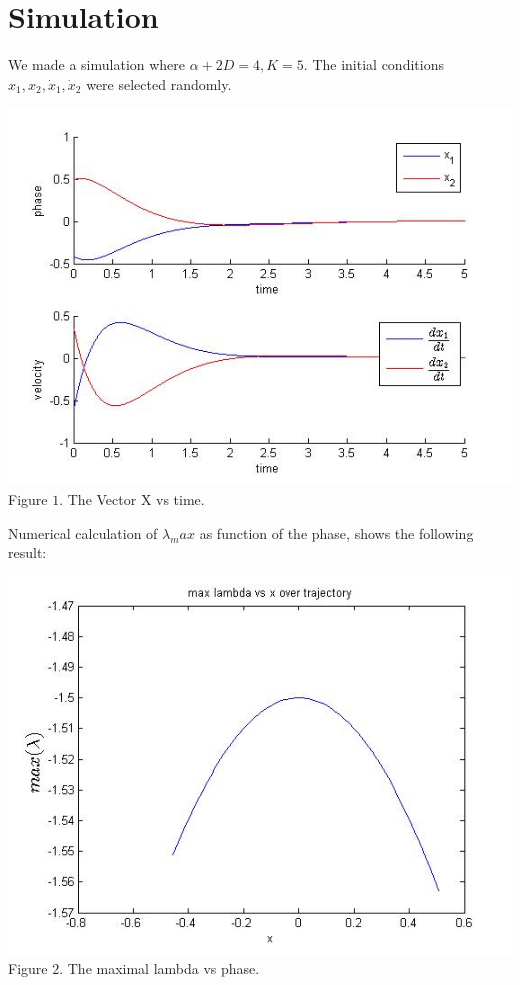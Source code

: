 \documentclass[10pt,onecolumn,twoside,letter]{IEEEtran}
\theoremstyle{plain}
\begin{document}
\section{Simulation}\label{sec:Simulation}
We made a simulation where $\alpha+2D = 4,  K = 5$. The initial conditions $x_1, x_2, \dot x_1,\dot x_2$ were selected randomly.

\begin{center}
\includegraphics[scale=0.55]{xOverTime} \vspace{-4mm}
{Figure $1$. The Vector X vs time.}
\end{center}

Numerical calculation of $\lambda_max$ as function of the phase, shows the following result:

\begin{center}
\includegraphics[scale=0.55]{lambdaVsX} \vspace{-4mm}
{Figure $2$. The maximal lambda vs phase.}
\end{center}
\end{document}
